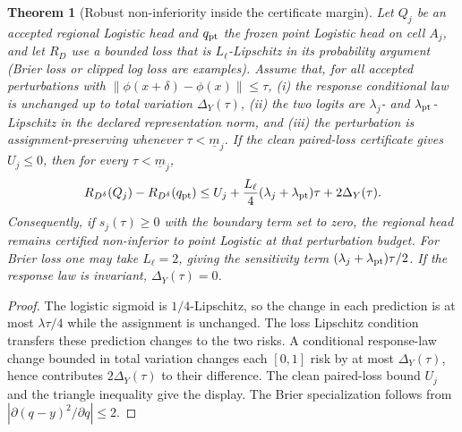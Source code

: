 \documentclass[11pt,a4paper]{article}
\newcommand{\norm}[1]{\left\lVert#1\right\rVert}
\numberwithin{equation}{section}
\newtheorem{theorem}{Theorem}[section]
\theoremstyle{definition}\newtheorem{definition}[theorem]{Definition}
\theoremstyle{remark}\newtheorem{remark}[theorem]{Remark}
\begin{document}
\begin{theorem}[Robust non-inferiority inside the certificate margin]\label{thm:robust_margin}
Let $Q_j$ be an accepted regional Logistic head and $q_{\rm pt}$ the frozen point
Logistic head on cell $A_j$, and let $R_D$ use a bounded loss that is
$L_{\ell}$-Lipschitz in its probability argument (Brier loss or clipped
log loss are examples).  Assume that, for all accepted perturbations with
$\norm{\phi(x+\delta)-\phi(x)}\le\tau$, (i) the response conditional law is
unchanged up to total variation $\Delta_Y(\tau)$, (ii) the two logits are
$\lambda_j$- and $\lambda_{\rm pt}$-Lipschitz in the declared representation
norm, and (iii) the perturbation is assignment-preserving whenever
$\tau<\underline m_j$.  If the clean paired-loss certificate gives $U_j\le0$,
then for every $\tau<\underline m_j$,
\[
 R_{D^{\delta}}(Q_j)-R_{D^{\delta}}(q_{\rm pt})
 \le U_j+\frac{L_{\ell}}{4}(\lambda_j+\lambda_{\rm pt})\tau
       +2\Delta_Y(\tau).
\]
Consequently, if $s_j(\tau)\ge0$ with the boundary term set to zero, the regional
head remains certified non-inferior to point Logistic at that perturbation budget.
For Brier loss one may take $L_{\ell}=2$, giving the sensitivity term
$(\lambda_j+\lambda_{\rm pt})\tau/2$.  If the response law is invariant,
$\Delta_Y(\tau)=0$.
\end{theorem}
\begin{proof}
The logistic sigmoid is $1/4$-Lipschitz, so the change in each prediction is at
most $\lambda\tau/4$ while the assignment is unchanged.  The loss Lipschitz
condition transfers these prediction changes to the two risks.  A conditional
response-law change bounded in total variation changes each $[0,1]$ risk by at
most $\Delta_Y(\tau)$, hence contributes $2\Delta_Y(\tau)$ to their difference.
The clean paired-loss bound $U_j$ and the triangle inequality give the display.
The Brier specialization follows from $|\partial(q-y)^2/\partial q|\le2$.
\end{proof}
\end{document}
